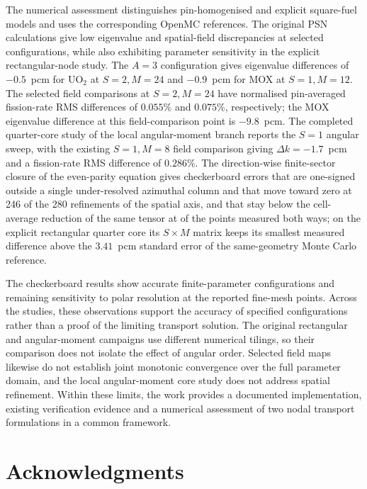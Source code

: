 \documentclass[11pt,a4paper]{article}
\begin{document}
The numerical assessment distinguishes pin-homogenised and explicit
square-fuel models and uses the corresponding OpenMC references. The
original PSN calculations give low eigenvalue and spatial-field
discrepancies at selected configurations, while also exhibiting
parameter sensitivity in the explicit rectangular-node study. The
$A{=}3$ configuration gives eigenvalue differences of $-0.5$~pcm for
UO$_2$ at $S{=}2,M{=}24$ and $-0.9$~pcm for MOX at $S{=}1,M{=}12$. The
selected field comparisons at $S{=}2,M{=}24$ have normalised
pin-averaged fission-rate RMS differences of $0.055\%$ and
$0.075\%$, respectively; the MOX eigenvalue difference at this
field-comparison point is $-9.8$~pcm. The completed quarter-core study
of the local angular-moment branch reports the $S{=}1$ angular sweep,
with the existing $S{=}1,M{=}8$ field comparison giving
$\Delta k=-1.7$~pcm and a fission-rate RMS difference of
$0.286\%$. The direction-wise finite-sector closure of the even-parity
equation gives checkerboard errors that are one-signed outside a single
under-resolved azimuthal column and that move toward zero at 246 of the 280
refinements of the spatial axis, and that stay below the cell-average reduction
of the same tensor at \StudyFourSmaller{} of the \StudyFourPairs{} points measured both ways; on the explicit rectangular quarter core
its $S\times M$ matrix keeps its smallest measured difference
above the $3.41$~pcm standard error of the same-geometry Monte Carlo
reference.

The checkerboard results show accurate finite-parameter
configurations and remaining sensitivity to polar resolution at the
reported fine-mesh points. Across the studies, these observations
support the accuracy of specified configurations rather than a proof
of the limiting transport solution. The original rectangular and
angular-moment campaigns use different numerical tilings, so their
comparison does not isolate the effect of angular order. Selected
field maps likewise do not establish joint monotonic convergence over
the full parameter domain, and the local angular-moment core study does
not address spatial refinement. Within these limits, the work provides
a documented implementation, existing verification evidence and a
numerical assessment of two nodal transport formulations in a common
framework.

\section*{Acknowledgments}
\end{document}
